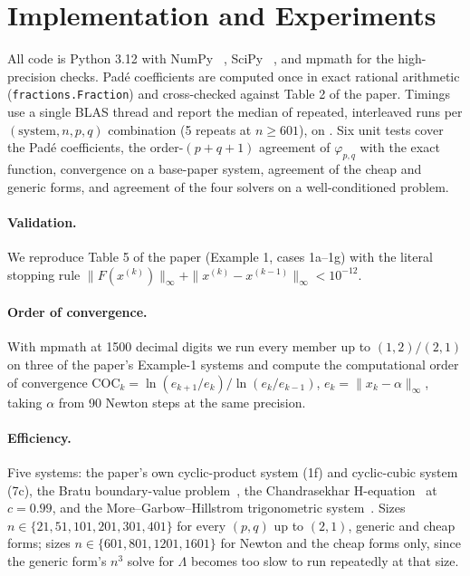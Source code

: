 \documentclass[sigconf,nonacm]{acmart}
\begin{document}
\section{Implementation and Experiments}

All code is Python 3.12 with NumPy~\cite{numpy} \pyver, SciPy~\cite{scipy} \spver, and mpmath for
the high-precision checks. Pad\'e coefficients are computed once in exact rational arithmetic
(\texttt{fractions.Fraction}) and cross-checked against Table 2 of the paper. Timings use a
single BLAS thread and report the median of \repeats{} repeated, interleaved runs per
$(\text{system},n,p,q)$ combination (5 repeats at $n\ge601$), on \cpuname. Six unit tests cover
the Pad\'e coefficients, the order-$(p{+}q{+}1)$ agreement of $\varphi_{p,q}$ with the exact
function, convergence on a base-paper system, agreement of the cheap and generic forms, and
agreement of the four solvers on a well-conditioned problem.

\paragraph{Validation.} We reproduce Table 5 of the paper (Example 1, cases 1a--1g) with the
literal stopping rule $\|F(x^{(k)})\|_\infty+\|x^{(k)}-x^{(k-1)}\|_\infty<10^{-12}$.

\paragraph{Order of convergence.} With mpmath at 1500 decimal digits we run every member up to
$(1,2)/(2,1)$ on three of the paper's Example-1 systems and compute the computational order of
convergence $\mathrm{COC}_k=\ln(e_{k+1}/e_k)/\ln(e_k/e_{k-1})$, $e_k=\|x_k-\alpha\|_\infty$,
taking $\alpha$ from 90 Newton steps at the same precision.

\paragraph{Efficiency.} Five systems: the paper's own cyclic-product system (1f) and cyclic-cubic
system (7c), the Bratu boundary-value problem~\cite{bratu1914}, the Chandrasekhar
H-equation~\cite{chandrasekhar1960} at $c=0.99$, and the More--Garbow--Hillstrom trigonometric
system~\cite{morgarhil1981}. Sizes $n\in\{21,51,101,201,301,401\}$ for every $(p,q)$ up to
$(2,1)$, generic and cheap forms; sizes $n\in\{601,801,1201,1601\}$ for Newton and the cheap
forms only, since the generic form's $n^3$ solve for $\Lambda$ becomes too slow to run
repeatedly at that size.
\end{document}
